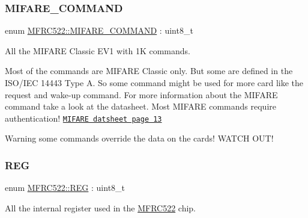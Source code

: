 \subsubsection{\texorpdfstring{M\+I\+F\+A\+R\+E\+\_\+\+C\+O\+M\+M\+A\+ND}{MIFARE\_COMMAND}}
{\footnotesize\ttfamily enum \mbox{\hyperlink{class_m_f_r_c522_a79bd44224bb1ad85e28a0937a6715818}{M\+F\+R\+C522\+::\+M\+I\+F\+A\+R\+E\+\_\+\+C\+O\+M\+M\+A\+ND}} \+: uint8\+\_\+t}



All the M\+I\+F\+A\+RE Classic E\+V1 with 1K commands. 

Most of the commands are M\+I\+F\+A\+RE Classic only. But some are defined in the I\+S\+O/\+I\+EC 14443 Type A. So some command might be used for more card like the request and wake-\/up command. For more information about the M\+I\+F\+A\+RE command take a look at the datasheet. Most M\+I\+F\+A\+RE commands require authentication! \href{http://www.orangetags.com/wp-content/downloads/datasheet/NXP/Mifare%20EV1%201K.pdf}{\tt M\+I\+F\+A\+RE datsheet page 13} \begin{DoxyWarning}{Warning}
some commands override the data on the cards! W\+A\+T\+CH O\+U\+T! 
\end{DoxyWarning}
\mbox{\label{class_m_f_r_c522_ae7ec09eb8c9c61288a4770175b4b8db7}} 
\subsubsection{\texorpdfstring{R\+EG}{REG}}
{\footnotesize\ttfamily enum \mbox{\hyperlink{class_m_f_r_c522_ae7ec09eb8c9c61288a4770175b4b8db7}{M\+F\+R\+C522\+::\+R\+EG}} \+: uint8\+\_\+t}



All the internal register used in the \mbox{\hyperlink{class_m_f_r_c522}{M\+F\+R\+C522}} chip. 

